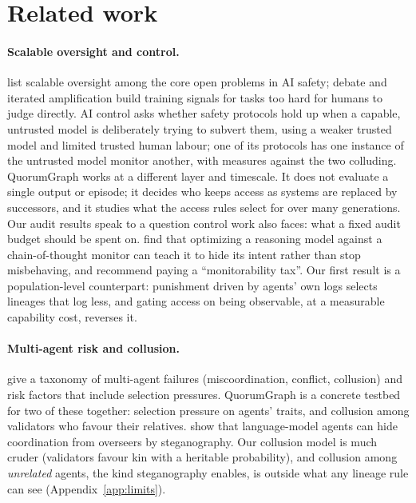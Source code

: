 \documentclass[11pt]{article}
\begin{document}
\section{Related work}

\paragraph{Scalable oversight and control.} \citet{amodei2016concrete} list scalable
oversight among the core open problems in AI safety; debate \citep{irving2018debate} and
iterated amplification \citep{christiano2018amplification} build training signals for tasks
too hard for humans to judge directly. AI control \citep{greenblatt2023control} asks whether
safety protocols hold up when a capable, untrusted model is deliberately trying to subvert
them, using a weaker trusted model and limited trusted human labour; one of its protocols has
one instance of the untrusted model monitor another, with measures against the two colluding.
QuorumGraph works at a different layer and timescale. It does not evaluate a single output or
episode; it decides who keeps access as systems are replaced by successors, and it studies
what the access rules select for over many generations. Our audit results speak to a question
control work also faces: what a fixed audit budget should be spent on.
\citet{baker2025monitoring} find that optimizing a reasoning model against a chain-of-thought
monitor can teach it to hide its intent rather than stop misbehaving, and recommend paying a
``monitorability tax''. Our first result is a population-level counterpart: punishment driven
by agents' own logs selects lineages that log less, and gating access on being observable,
at a measurable capability cost, reverses it.

\paragraph{Multi-agent risk and collusion.} \citet{hammond2025multiagent} give a taxonomy of
multi-agent failures (miscoordination, conflict, collusion) and risk factors that include
selection pressures. QuorumGraph is a concrete testbed for two of these together: selection
pressure on agents' traits, and collusion among validators who favour their relatives.
\citet{motwani2024collusion} show that language-model agents can hide coordination from
overseers by steganography. Our collusion model is much cruder (validators favour kin with a
heritable probability), and collusion among \emph{unrelated} agents, the kind steganography
enables, is outside what any lineage rule can see (Appendix~\ref{app:limits}).
\end{document}
